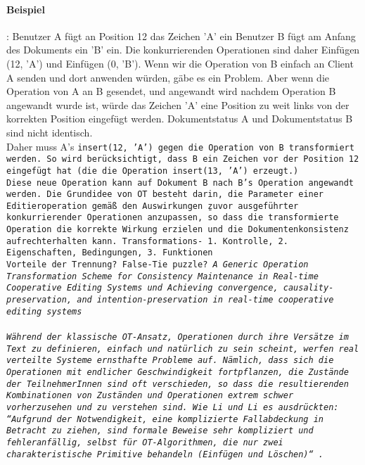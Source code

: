       \paragraph{Beispiel}:
      Benutzer A fügt an Position 12 das Zeichen 'A' ein
      Benutzer B fügt am Anfang des Dokuments ein 'B' ein.
      Die konkurrierenden Operationen sind daher Einfügen (12, 'A') und Einfügen (0, 'B').
      Wenn wir die Operation von B einfach an Client A senden und dort anwenden würden, gäbe es ein Problem.
      Aber wenn die Operation von A an B gesendet, und angewandt wird nachdem Operation B angewandt wurde ist, würde das Zeichen 'A' eine Position zu weit links von der korrekten Position eingefügt werden.
      Dokumentstatus A und Dokumentstatus B sind nicht identisch.\\
      Daher muss A's \tt{insert(12, 'A')} gegen die Operation von B transformiert werden. So wird berücksichtigt, dass B ein Zeichen vor der Position 12 eingefügt hat (die die Operation \tt{insert(13, 'A')} erzeugt.)\\
      Diese neue Operation kann auf Dokument B nach B's Operation angewandt werden.
      Die Grundidee von \gls{OT} besteht darin, die Parameter einer Editieroperation gemäß den Auswirkungen \b{zuvor ausgeführter} konkurrierender Operationen anzupassen, so dass die transformierte Operation die korrekte Wirkung erzielen und die Dokumentenkonsistenz aufrechterhalten kann.
      Transformations- 1. Kontrolle, 2. Eigenschaften, Bedingungen, 3. Funktionen\\
      Vorteile der Trennung?
      False-Tie puzzle? \it{A Generic Operation Transformation Scheme for Consistency Maintenance in Real-time Cooperative Editing Systems} und \it{Achieving convergence, causality-preservation, and intention-preservation in real-time cooperative editing systems}\\\\
      Während der klassische OT-Ansatz, Operationen durch ihre Versätze im Text zu definieren, einfach und natürlich zu sein scheint, werfen real verteilte Systeme ernsthafte Probleme auf. Nämlich, dass sich die Operationen mit endlicher Geschwindigkeit fortpflanzen, die Zustände der TeilnehmerInnen sind oft verschieden, so dass die resultierenden Kombinationen von Zuständen und Operationen extrem schwer vorherzusehen und zu verstehen sind.
      Wie Li und Li es ausdrückten: ``Aufgrund der Notwendigkeit, eine komplizierte Fallabdeckung in Betracht zu ziehen, sind formale Beweise sehr kompliziert und fehleranfällig, selbst für OT-Algorithmen, die nur zwei charakteristische Primitive behandeln (Einfügen und Löschen)``~\cite{ot-critic}.\\
